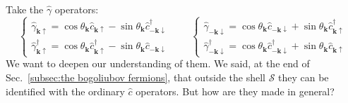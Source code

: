 Take the $\hat{\gamma}$ operators:
\[
	\begin{cases}
		\hat{\gamma}_{\mathbf{k}\uparrow} = \cos\theta_\mathbf{k} \hat{c}_{\mathbf{k}\uparrow} - \sin\theta_\mathbf{k} \hat{c}_{-\mathbf{k}\downarrow}^\dagger \\
		\hat{\gamma}_{\mathbf{k}\uparrow}^\dagger = \cos\theta_\mathbf{k} \hat{c}_{\mathbf{k}\uparrow}^\dagger - \sin\theta_\mathbf{k} \hat{c}_{-\mathbf{k}\downarrow}
	\end{cases}
	\qquad
	\begin{cases}
		\hat{\gamma}_{-\mathbf{k}\downarrow} = \cos\theta_\mathbf{k} \hat{c}_{-\mathbf{k}\downarrow} + \sin\theta_\mathbf{k} \hat{c}_{\mathbf{k}\uparrow}^\dagger \\
		\hat{\gamma}_{-\mathbf{k}\downarrow}^\dagger = \cos\theta_\mathbf{k} \hat{c}_{-\mathbf{k}\downarrow}^\dagger + \sin\theta_\mathbf{k} \hat{c}_{\mathbf{k}\uparrow}
	\end{cases}
\]
We want to deepen our understanding of them. We said, at the end of Sec.~\ref{subsec:the bogoliubov fermions}, that outside the shell $\mathcal{S}$ they can be identified with the ordinary $\hat{c}$ operators. But how are they made in general?


